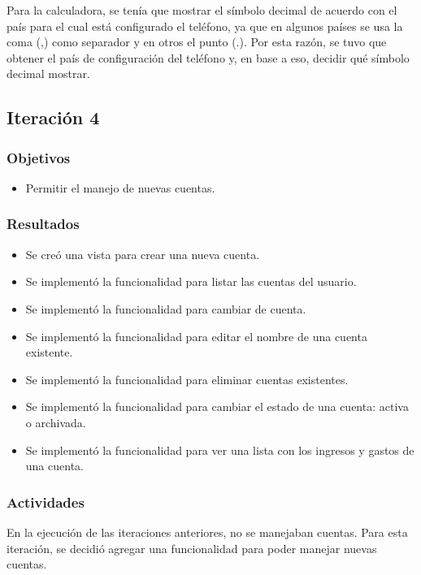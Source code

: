 Para la calculadora, se tenía que mostrar el símbolo decimal de acuerdo con el país para el cual está configurado el teléfono, ya que en algunos países se usa la coma (,) como separador y en otros el punto (.). Por esta razón, se tuvo que obtener el país de configuración del teléfono y, en base a eso, decidir qué símbolo decimal mostrar.

\subsection{Iteración 4}
\subsubsection{Objetivos}
\begin{itemize}
\item Permitir el manejo de nuevas cuentas.
\end{itemize}

\subsubsection{Resultados}
\begin{itemize}

\item Se creó una vista para crear una nueva cuenta.
\item Se implementó la funcionalidad para listar las cuentas del usuario.
\item Se implementó la funcionalidad para cambiar de cuenta.
\item Se implementó la funcionalidad para editar el nombre de una cuenta existente.
\item Se implementó la funcionalidad para eliminar cuentas existentes.
\item Se implementó la funcionalidad para cambiar el estado de una cuenta: activa o archivada.
\item Se implementó la funcionalidad para ver una lista con los ingresos y gastos de una cuenta.

\end{itemize}

\subsubsection{Actividades}
En la ejecución de las iteraciones anteriores, no se manejaban cuentas. Para esta iteración, se decidió agregar una funcionalidad para poder manejar nuevas cuentas. 


